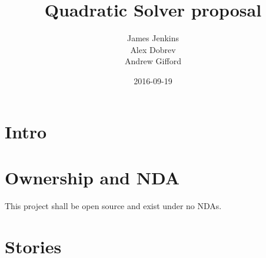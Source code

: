 \documentclass{article}
\title{Quadratic Solver proposal}
\date{2016-09-19}
\author{James Jenkins\\
Alex Dobrev\\
Andrew Gifford}
\begin{document}
    \maketitle
    \newpage

    \section{Intro}

    \section{Ownership and NDA}
    This project shall be open source and exist under no NDAs.

    \section{Stories}
\end{document}
